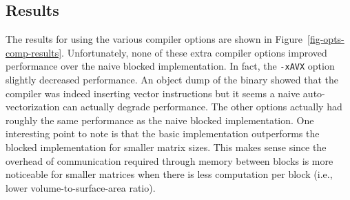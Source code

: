 \subsection{Results}



The results for using the various compiler options are shown in
Figure~\ref{fig-opts-comp-results}. Unfortunately, none of these extra
compiler options improved performance over the naive blocked
implementation. In fact, the {\tt{-xAVX}} option slightly decreased
performance. An object dump of the binary showed that the compiler was
indeed inserting vector instructions but it seems a naive
auto-vectorization can actually degrade performance. The other options
actually had roughly the same performance as the naive blocked
implementation. One interesting point to note is that the basic
implementation outperforms the blocked implementation for smaller matrix
sizes. This makes sense since the overhead of communication required
through memory between blocks is more noticeable for smaller matrices
when there is less computation per block (i.e., lower
volume-to-surface-area ratio).

\clearpage
